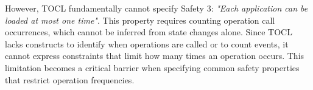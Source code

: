 However, TOCL fundamentally cannot specify Safety 3: \textit{"Each application can be loaded at most one time"}. This property requires counting operation call occurrences, which cannot be inferred from state changes alone. Since TOCL lacks constructs to identify when operations are called or to count events, it cannot express constraints that limit how many times an operation occurs. This limitation becomes a critical barrier when specifying common safety properties that restrict operation frequencies.



